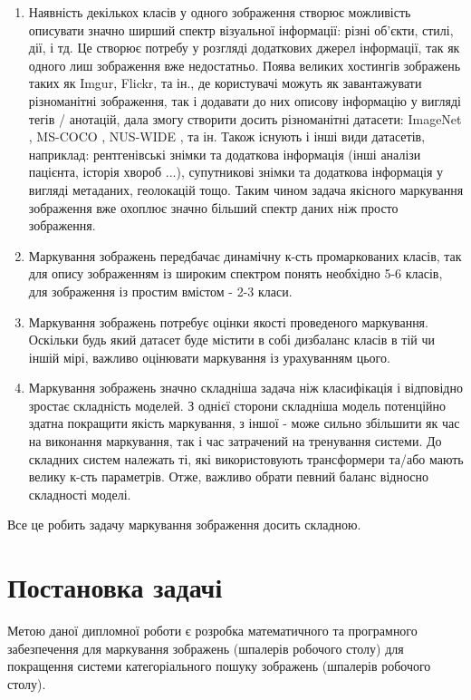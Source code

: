\documentclass{udstu}
\begin{document}
\begin{enumerate}[1)]
	\item Наявність декількох класів у одного зображення створює можливість
описувати значно ширший спектр візуальної інформації: різні об'єкти, стилі, дії, і тд.
Це створює потребу у розгляді додаткових джерел інформації, так як одного лиш зображення вже недостатньо.
Поява великих хостингів зображень таких як Imgur, Flickr, та ін., де користувачі можуть
як завантажувати різноманітні зображення, так і додавати до них описову інформацію у вигляді
тегів / анотацій, дала змогу створити досить різноманітні датасети: ImageNet \cite{deng2009imagenet},
MS-COCO \cite{cocodataset}, NUS-WIDE \cite{nus-wide-civr09}, та ін. Також існують і інші види датасетів,
наприклад: рентгенівські знімки та додаткова інформація (інші аналізи пацієнта, історія хвороб ...),
супутникові знімки та додаткова інформація у вигляді метаданих, геолокацій тощо.
Таким чином задача якісного маркування зображення вже охоплює значно більший спектр даних ніж просто
зображення.

	\item Маркування зображень передбачає динамічну к-сть промаркованих класів,
так для опису зображенням із широким спектром понять необхідно 5-6 класів,
для зображення із простим вмістом - 2-3 класи.

	\item Маркування зображень потребує оцінки якості проведеного маркування. Оскільки будь який
датасет буде містити в собі дизбаланс класів в тій чи іншій мірі, важливо оцінювати маркування із
урахуванням цього.

	\item Маркування зображень значно складніша задача ніж класифікація і відповідно зростає
складність моделей. З однієї сторони складніша модель потенційно здатна покращити якість маркування,
з іншої - може сильно збільшити як час на виконання маркування, так і час затрачений на тренування системи.
До складних систем належать ті, які використовують трансформери та/або мають велику к-сть параметрів.
Отже, важливо обрати певний баланс відносно складності моделі.
\end{enumerate}

Все це робить задачу маркування зображення досить складною.


\chapter{Постановка задачі}

Метою даної дипломної роботи є розробка математичного та програмного забезпечення для
маркування зображень (шпалерів робочого столу) для покращення системи категоріального
пошуку зображень (шпалерів робочого столу).
\end{document}
